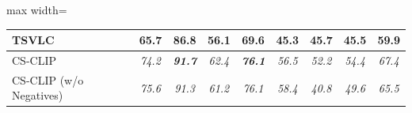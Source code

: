 \begin{table}[t]
\begin{adjustbox}{max width=\textwidth}
\begin{tabular}{p{5cm}cccc|ccc|c}
    TSVLC & 65.7 & 86.8 & 56.1 & 69.6 & 45.3 & 45.7 & 45.5 & 59.9 \\
    \midrule
    CS-CLIP & \emph{74.2} & \emph{\textbf{91.7}} & \emph{62.4} & \emph{\textbf{76.1}} & \emph{56.5} & \emph{52.2} & \emph{54.4} & \emph{67.4} \\
    CS-CLIP (w/o Negatives) & \emph{75.6} & \emph{91.3} & \emph{61.2} & \emph{76.1} & \emph{58.4} & \emph{40.8} & \emph{49.6} & \emph{65.5} \\
    \bottomrule
  \end{tabular}
  \end{adjustbox}
\end{table}